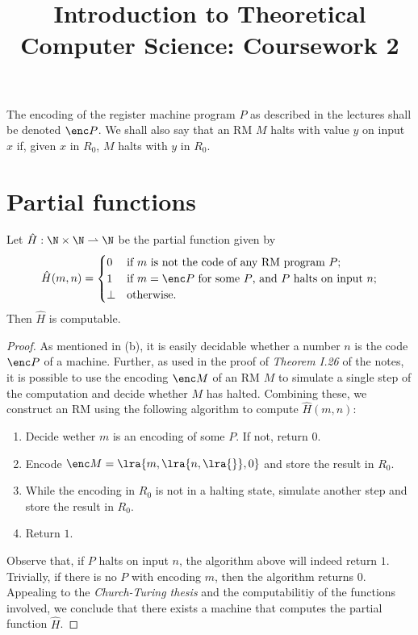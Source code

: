 \documentclass{article}
\title{Introduction to Theoretical Computer Science: Coursework 2}
\author{}
\begin{document}
\maketitle
\noindent The encoding of the register machine program $P$ as described in the lectures shall be denoted $\enc P$.
We shall also say that an RM $M$ halts with value $y$ on input $x$ if, given $x$ in $R_0$, $M$ halts
with $y$ in $R_0$.
\section{Partial functions}
\begin{claim*}[a, 1]
	Let $\hat H:\N\times\N\rightharpoonup\N$ be the partial function given by
	\begin{align*}
		\hat H(m,n)=\begin{cases}
			0    & \text{if $m$ is not the code of any RM program $P$;}           \\
			1    & \text{if $m=\enc P$ for some $P$, and $P$ halts on input $n$;} \\
			\bot & \text{otherwise}.
		\end{cases}
	\end{align*}
	Then $\hat H$ is computable.
	\begin{proof}
		As mentioned in (b), it is easily decidable whether a number $n$ is the code $\enc P$ of a
		machine. Further, as used in the proof of \emph{Theorem I.26} of the notes, it is possible
		to use the encoding $\enc M$ of an RM $M$ to simulate a single step of the computation and decide whether
		$M$ has halted. Combining these, we construct an RM using the following algorithm to compute
		$\hat H(m,n)$:
		\begin{enumerate}
			\item Decide wether $m$ is an encoding of some $P$. If not, return $0$.
			\item Encode $\enc M=\lra{m, \lra{n, \lra{}}, 0}$ and store the result in $R_0$.
			\item While the encoding in $R_0$ is not in a halting state, simulate another step and store the result in $R_0$.
			\item Return $1$.
		\end{enumerate}
		Observe that, if $P$ halts on input $n$, the algorithm above will indeed return $1$. Trivially,
		if there is no $P$ with encoding $m$, then the algorithm returns $0$.
		Appealing to the \emph{Church-Turing thesis} and the computabilitiy of the functions involved,
		we conclude that there exists a machine that computes the partial function $\hat H$.
	\end{proof}
\end{claim*}
\end{document}
